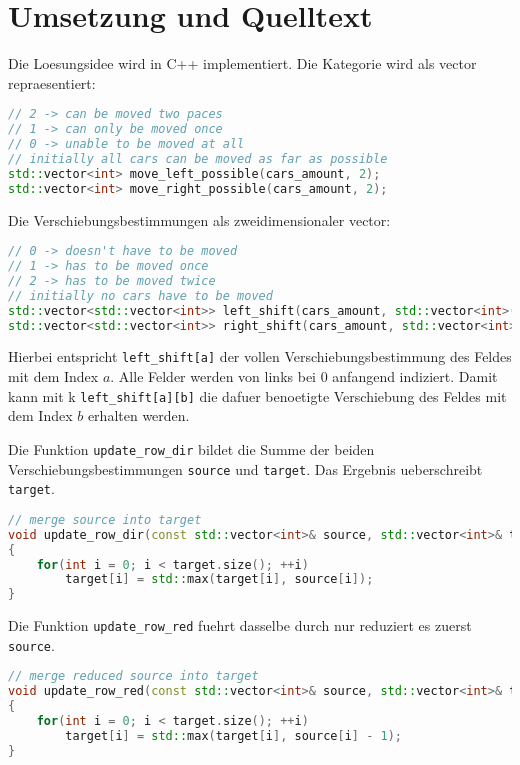 \documentclass[a4paper,10pt,ngerman]{scrartcl}
\begin{document}
\section{Umsetzung und Quelltext}
Die Loesungsidee wird in C++ implementiert.
Die Kategorie wird als vector repraesentiert:
\begin{lstlisting}[language=C++]
// 2 -> can be moved two paces
// 1 -> can only be moved once
// 0 -> unable to be moved at all
// initially all cars can be moved as far as possible
std::vector<int> move_left_possible(cars_amount, 2);
std::vector<int> move_right_possible(cars_amount, 2);
\end{lstlisting}
Die Verschiebungsbestimmungen als zweidimensionaler vector:
\begin{lstlisting}[language=C++]
// 0 -> doesn't have to be moved
// 1 -> has to be moved once
// 2 -> has to be moved twice
// initially no cars have to be moved
std::vector<std::vector<int>> left_shift(cars_amount, std::vector<int>(cars_amount, 0));
std::vector<std::vector<int>> right_shift(cars_amount, std::vector<int>(cars_amount, 0));
\end{lstlisting}
Hierbei entspricht \lstinline{left_shift[a]} der vollen Verschiebungsbestimmung des Feldes mit dem Index $a$.
Alle Felder werden von links bei $0$ anfangend indiziert.
Damit kann mit k \lstinline{left_shift[a][b]} die dafuer benoetigte Verschiebung des Feldes mit dem Index $b$ erhalten werden.

Die Funktion \lstinline{update_row_dir} bildet die Summe der beiden Verschiebungsbestimmungen \lstinline{source} und \lstinline{target}.
Das Ergebnis ueberschreibt \lstinline{target}.
\begin{lstlisting}[language=C++]
// merge source into target
void update_row_dir(const std::vector<int>& source, std::vector<int>& target)
{
    for(int i = 0; i < target.size(); ++i)
        target[i] = std::max(target[i], source[i]);
}
\end{lstlisting}

Die Funktion \lstinline{update_row_red} fuehrt dasselbe durch nur reduziert es zuerst \lstinline{source}.
\begin{lstlisting}[language=C++]
// merge reduced source into target
void update_row_red(const std::vector<int>& source, std::vector<int>& target)
{
    for(int i = 0; i < target.size(); ++i)
        target[i] = std::max(target[i], source[i] - 1);
}
\end{lstlisting}
\end{document}
